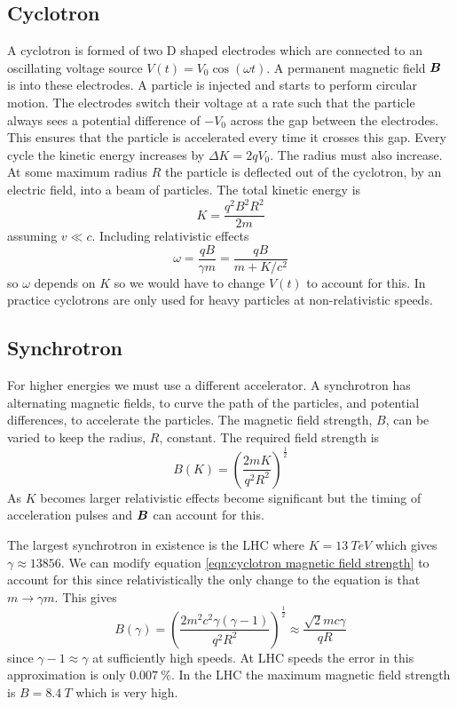 \documentclass{article}
\begin{document}
    \subsection{Cyclotron}
    A cyclotron is formed of two D shaped electrodes which are connected to an oscillating voltage source \(V(t) = V_0\cos(\omega t)\).
    A permanent magnetic field \(\bm{B}\) is into these electrodes.
    A particle is injected and starts to perform circular motion.
    The electrodes switch their voltage at a rate such that the particle always sees a potential difference of \(-V_0\) across the gap between the electrodes.
    This ensures that the particle is accelerated every time it crosses this gap.
    Every cycle the kinetic energy increases by \(\Delta K = 2qV_0\).
    The radius must also increase.
    At some maximum radius \(R\) the particle is deflected out of the cyclotron, by an electric field, into a beam of particles.
    The total kinetic energy is
    \[K = \frac{q^2B^2R^2}{2m}\]
    assuming \(v\ll c\).
    Including relativistic effects
    \[\omega = \frac{qB}{\gamma m} = \frac{qB}{m + K/c^2}\]
    so \(\omega\) depends on \(K\) so we would have to change \(V(t)\) to account for this.
    In practice cyclotrons are only used for heavy particles at non-relativistic speeds.
    
    \subsection{Synchrotron}
    For higher energies we must use a different accelerator.
    A synchrotron has alternating magnetic fields, to curve the path of the particles, and potential differences, to accelerate the particles.
    The magnetic field strength, \(B\), can be varied to keep the radius, \(R\), constant.
    The required field strength is
    \begin{equation}\label{eqn:cyclotron magnetic field strength}
        B(K) = \left(\frac{2mK}{q^2R^2}\right)^\frac{1}{2}
    \end{equation}
    As \(K\) becomes larger relativistic effects become significant but the timing of acceleration pulses and \(\bm{B}\) can account for this.
    
    The largest synchrotron in existence is the LHC where \(K = \SI{13}{TeV}\) which gives \(\gamma \approx 13856\).
    We can modify equation \ref{eqn:cyclotron magnetic field strength} to account for this since relativistically the only change to the equation is that \(m\to\gamma m\).
    This gives
    \[B(\gamma) = \left(\frac{2m^2c^2\gamma(\gamma - 1)}{q^2R^2}\right)^\frac{1}{2} \approx \frac{\sqrt{2}mc\gamma}{qR}\]
    since \(\gamma - 1 \approx \gamma\) at sufficiently high speeds.
    At LHC speeds the error in this approximation is only \(\SI{0.007}{\%}\).
    In the LHC the maximum magnetic field strength is \(B = \SI{8.4}{T}\) which is very high.
    
\end{document}
